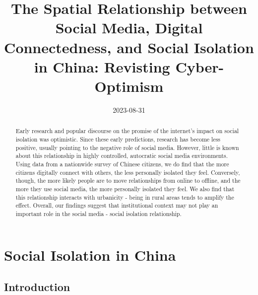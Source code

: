 \documentclass[
  letterpaper,
  DIV=11,
  numbers=noendperiod]{scrartcl}
\title{The Spatial Relationship between Social Media, Digital
Connectedness, and Social Isolation in China: Revisting Cyber-Optimism}
\author{}
\date{2023-08-31}
\begin{document}
\maketitle
\begin{abstract}
Early research and popular discourse on the promise of the internet's
impact on social isolation was optimistic. Since these early
predictions, research has become less positive, usually pointing to the
negative role of social media. However, little is known about this
relationship in highly controlled, autocratic social media environments.
Using data from a nationwide survey of Chinese citizens, we do find that
the more citizens digitally connect with others, the less personally
isolated they feel. Conversely, though, the more likely people are to
move relationships from online to offline, and the more they use social
media, the more personally isolated they feel. We also find that this
relationship interacts with urbanicity - being in rural areas tends to
amplify the effect. Overall, our findings suggest that institutional
context may not play an important role in the social media - social
isolation relationship.
\end{abstract}
\ifdefined\Shaded\renewenvironment{Shaded}{\begin{tcolorbox}[sharp corners, interior hidden, frame hidden, borderline west={3pt}{0pt}{shadecolor}, boxrule=0pt, breakable, enhanced]}{\end{tcolorbox}}\fi

\newpage{}

\hypertarget{social-isolation-in-china}{%
\section{Social Isolation in China}\label{social-isolation-in-china}}

\hypertarget{introduction}{%
\subsection{Introduction}\label{introduction}}
\end{document}
